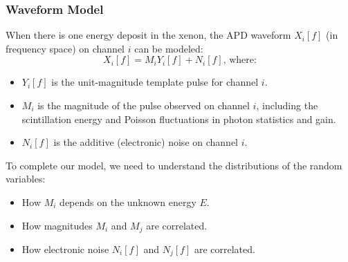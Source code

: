 \documentclass{beamer}
\begin{document}
\begin{frame}
\begin{center}
{ %
}\end{center}
\end{frame}

\begin{frame}
\begin{center}
\frametitle{Waveform Model}
\end{center}
\vspace{0.5cm}
When there is one energy deposit in the xenon, the APD waveform $X_i[f]$ (in frequency space) on channel $i$ can be modeled:
\[X_i[f] = M_i Y_i[f] + N_i[f]\text{, where:}\]
\begin{itemize}
\item $Y_i[f]$ is the unit-magnitude template pulse for channel $i$.
\item $M_i$ is the magnitude of the pulse observed on channel $i$, including the scintillation energy and Poisson fluctuations in photon statistics and gain.
\item $N_i[f]$ is the additive (electronic) noise on channel $i$.\\[\baselineskip]
\end{itemize}

To complete our model, we need to understand the distributions of the random variables:
\begin{itemize}
\item How $M_i$ depends on the unknown energy $E$.
\item How magnitudes $M_i$ and $M_j$ are correlated.
\item How electronic noise $N_i[f]$ and $N_j[f]$ are correlated.
\end{itemize}
\end{frame}
\end{document}
